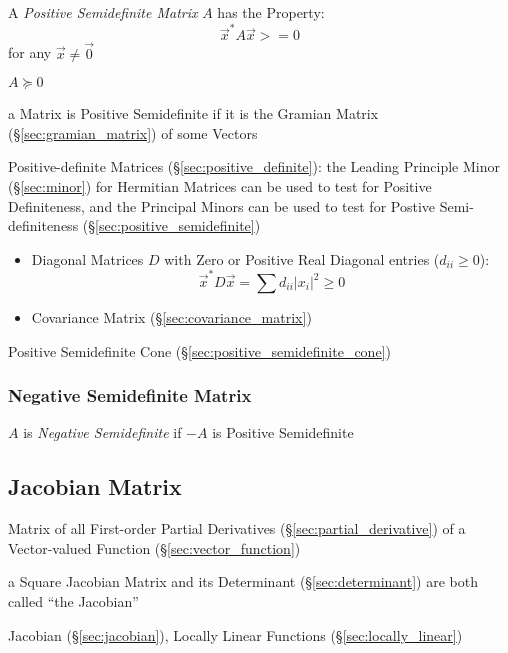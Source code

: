 A \emph{Positive Semidefinite Matrix} $A$ has the Property:
\[
  \vec{x}^* A \vec{x} >= 0
\]
for any $\vec{x} \neq \vec{0}$

$A \succeq 0$

a Matrix is Positive Semidefinite if it is the Gramian Matrix
(\S\ref{sec:gramian_matrix}) of some Vectors

Positive-definite Matrices (\S\ref{sec:positive_definite}): the Leading
Principle Minor (\S\ref{sec:minor}) for Hermitian Matrices can be used to test
for Positive Definiteness, and the Principal Minors can be used to test for
Postive Semi-definiteness (\S\ref{sec:positive_semidefinite})

\begin{itemize}
  \item Diagonal Matrices $D$ with Zero or Positive Real Diagonal entries
    ($d_{ii} \geq 0$):
    \[
      \vec{x}^*D\vec{x} = \sum d_{ii}|x_i|^2 \geq 0
    \]
  \item Covariance Matrix (\S\ref{sec:covariance_matrix})
\end{itemize}

\fist Positive Semidefinite Cone (\S\ref{sec:positive_semidefinite_cone})



\subsubsection{Negative Semidefinite Matrix}\label{sec:semidefinite_matrix}

$A$ is \emph{Negative Semidefinite} if $-A$ is Positive Semidefinite



\subsection{Jacobian Matrix}\label{sec:jacobian_matrix}


Matrix of all First-order Partial Derivatives (\S\ref{sec:partial_derivative})
of a Vector-valued Function (\S\ref{sec:vector_function})

a Square Jacobian Matrix and its Determinant (\S\ref{sec:determinant}) are both
called ``the Jacobian''

Jacobian (\S\ref{sec:jacobian}),
Locally Linear Functions (\S\ref{sec:locally_linear})

